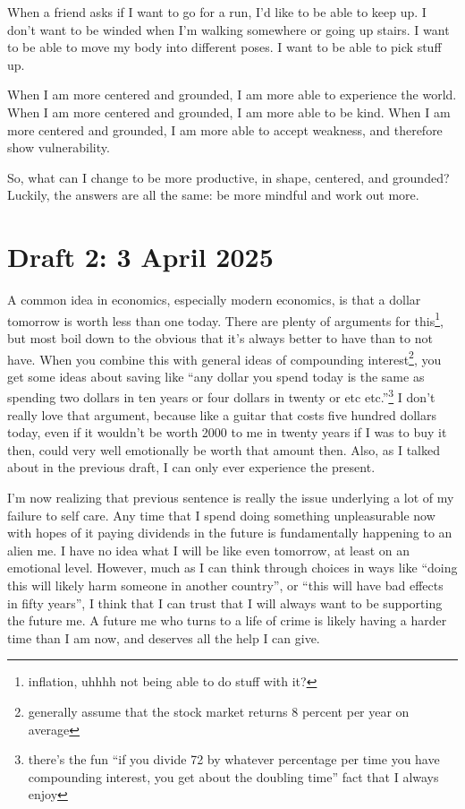 \documentclass[12pt]{article}[titlepage]
\newcommand{\say}[1]{``#1''}
\newcommand{\1}{\={a}}
\newcommand{\2}{\={e}}
\newcommand{\3}{\={\i}}
\newcommand{\4}{\=o}
\newcommand{\5}{\=u}
\newcommand{\6}{\={A}}
\renewcommand{\,}{\textsuperscript{,}}
\begin{document}
When a friend asks if I want to go for a run, I'd like to be able to keep up.  
I don't want to be winded when I'm walking somewhere or going up stairs.  
I want to be able to move my body into different poses.  
I want to be able to pick stuff up.

When I am more centered and grounded, I am more able to experience the world.  
When I am more centered and grounded, I am more able to be kind.  
When I am more centered and grounded, I am more able to accept weakness, and therefore show vulnerability.

So, what can I change to be more productive, in shape, centered, and grounded?  
Luckily, the answers are all the same: be more mindful and work out more.

\section{Draft 2: 3 April 2025}  
A common idea in economics, especially modern economics, is that a dollar tomorrow is worth less than one today.  
There are plenty of arguments for this\footnote{inflation, uhhhh not being able to do stuff with it?}, but most boil down to the obvious that it's always better to have than to not have.  
When you combine this with general ideas of compounding interest\footnote{generally assume that the stock market returns 8 percent per year on average}, you get some ideas about saving like \say{any dollar you spend today is the same as spending two dollars in ten years or four dollars in twenty or etc etc.}\footnote{there's the fun \say{if you divide 72 by whatever percentage per time you have compounding interest, you get about the doubling time} fact that I always enjoy}  
I don't really love that argument, because like a guitar that costs five hundred dollars today, even if it wouldn't be worth 2000 to me in twenty years if I was to buy it then, could very well emotionally be worth that amount then.  
Also, as I talked about in the previous draft, I can only ever experience the present.

I'm now realizing that previous sentence is really the issue underlying a lot of my failure to self care.  
Any time that I spend doing something unpleasurable now with hopes of it paying dividends in the future is fundamentally happening to an alien me.  
I have no idea what I will be like even tomorrow, at least on an emotional level.  
However, much as I can think through choices in ways like \say{doing this will likely harm someone in another country}, or \say{this will have bad effects in fifty years}, I think that I can trust that I will always want to be supporting the future me.  
A future me who turns to a life of crime is likely having a harder time than I am now, and deserves all the help I can give.
\end{document}
